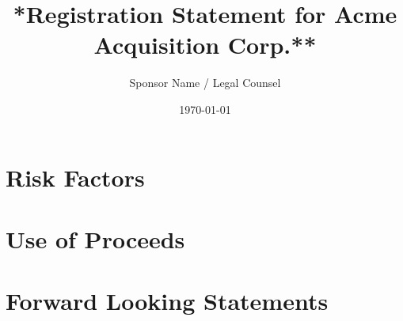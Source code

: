 \documentclass[10pt, letterpaper]{article}
\title{\LARGE **Registration Statement for Acme Acquisition Corp.**}
\author{Sponsor Name / Legal Counsel}
\date{\today}
\begin{document}
\maketitle

\section{Risk Factors}


\section{Use of Proceeds}


\section{Forward Looking Statements}

\end{document}
